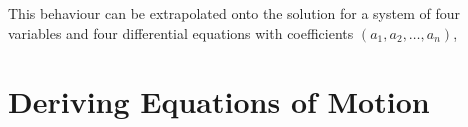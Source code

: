 \documentclass[12pt]{article}
\begin{document}
	This behaviour can be extrapolated onto the solution for a system of four variables and four differential equations with coefficients $(a_1, a_2, \dots, a_n)$,
	
	
	\newpage
	
	\section{Deriving Equations of Motion}
	
\end{document}
